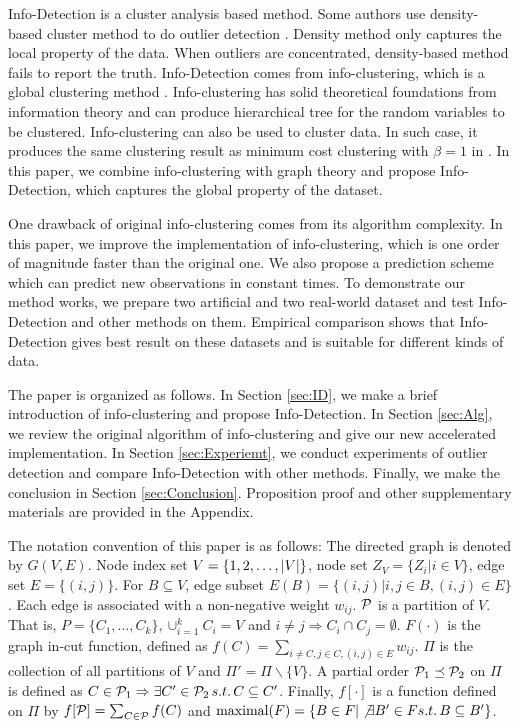 \documentclass[runningheads]{llncs}
\begin{document}
Info-Detection is a cluster analysis based method. Some authors use density-based cluster method to do outlier detection \cite{Campello}. Density method only captures the local property of the data. When outliers are concentrated, density-based method fails to report the truth. Info-Detection comes from info-clustering, which is a global clustering method \cite{RN1}. Info-clustering has solid theoretical foundations from information theory and can produce hierarchical tree for the random variables to be clustered. Info-clustering can also be used to cluster data. In such case, it produces the same clustering result as minimum cost clustering with $\beta = 1$ in \cite{RN7}. In this paper, we combine info-clustering with graph theory and propose Info-Detection, which captures the global property of the dataset.  

One drawback of original info-clustering comes from its algorithm complexity. In this paper, we improve the implementation of info-clustering, which is one order of magnitude faster than the original one. We also propose a prediction scheme which can predict new observations in constant times. To demonstrate our method works, we prepare two artificial and two real-world dataset and test Info-Detection and other methods on them. Empirical comparison shows that Info-Detection gives best result on these datasets and is suitable for different kinds of data.

The paper is organized as follows. In Section \ref{sec:ID}, we make a brief introduction of info-clustering and propose Info-Detection. In Section \ref{sec:Alg}, we review the original algorithm of info-clustering and give our new accelerated implementation. In Section \ref{sec:Experiemt}, we conduct experiments of outlier detection and compare Info-Detection with other methods. Finally, we make the conclusion in Section \ref{sec:Conclusion}. Proposition proof and other supplementary materials are provided in the Appendix.

The notation convention of this paper is as follows: The directed graph is denoted by $G(V, E)$. Node index set $V=\{1, 2,\dots, \abs{V}\}$, node set $Z_V=\{Z_i | i \in V\}$, edge set $E=\{(i, j)\}$. For $B\subseteq V$, edge subset $E(B) = \{(i,j)| i, j \in B,(i,j)\in E\}$. Each edge is associated with a non-negative weight $w_{ij}$. $\P$ is a partition of $V$. That is, $P=\{C_1, \dots, C_k\}, \cup_{i=1}^k C_i=V$ and $i\neq j \Rightarrow C_i \cap C_j =\emptyset $. $F(\cdot)$ is the graph in-cut function, defined as $f(C)=\sum_{i \neq C, j\in C, (i,j) \in E} w_{ij}$. $\Pi$ is the collection of all partitions of $V$ and $\Pi'=\Pi\backslash\{V\}$. A partial order $ \P_1 \preceq \P_2$ on $\Pi$ is defined as
$C \in \P_1 \Rightarrow \exists C' \in \P_2 \, s.t. \, C \subseteq C'$.
Finally, $f[\cdot]$ is a function defined on $\Pi$ by $f[\P]=\sum_{C\in \P}f(C)$ and $\textrm{maximal} (F)=\{B\in F | \not\exists B' \in F s.t.\, B \subseteq B'\}$.
\end{document}
